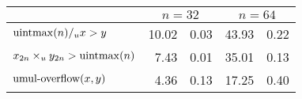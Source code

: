 \begin{tabular}{lr@{$\pm$}lr@{$\pm$}l} \toprule
 & \multicolumn{2}{c}{$n = 32$} & \multicolumn{2}{c}{$n = 64$} \\ \midrule
$\operatorname{uintmax}(n) /_u x > y$
& 10.02 & 0.03 & 43.93 & 0.22 \\
$x_{2n} \times_{u} y_{2n} > \operatorname{uintmax}(n)$
&  7.43 & 0.01 & 35.01 & 0.13 \\
$\operatorname{umul-overflow}(x, y)$
&  4.36 & 0.13 & 17.25 & 0.40 \\
\bottomrule
\end{tabular}
